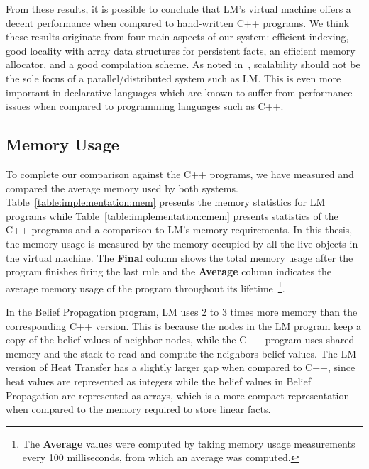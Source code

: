 From these results, it is possible to conclude that LM's virtual machine offers
a decent performance when compared to hand-written C++ programs. We think these
results originate from four main aspects of our system: efficient indexing, good
locality with array data structures for persistent facts, an efficient memory
allocator, and a good compilation scheme. As noted in~\cite{cost}, scalability
should not be the sole focus of a parallel/distributed system such as LM. This
is even more important in declarative languages which are known to suffer from
performance issues when compared to programming languages such as C++.

\subsection{Memory Usage}

To complete our comparison against the C++ programs, we have measured and
compared the average memory used by both systems.
Table~\ref{table:implementation:mem} presents the memory statistics for LM
programs while Table~\ref{table:implementation:cmem} presents statistics of the
C++ programs and a comparison to LM's memory requirements. In this thesis, the
memory usage is measured by the memory occupied by all the live objects in the
virtual machine. The \textbf{Final} column shows the total memory usage after
the program finishes firing the last rule and the \textbf{Average} column
indicates the average memory usage of the program throughout its
lifetime~\footnote{The \textbf{Average} values were computed by taking memory
usage measurements every 100 milliseconds, from which an average was computed.}.

In the Belief Propagation program, LM uses 2 to 3 times more memory than the
corresponding C++ version. This is because the nodes in the LM program keep a
copy of the belief values of neighbor nodes, while the C++ program uses shared
memory and the stack to read and compute the neighbors belief values. The LM
version of Heat Transfer has a slightly larger gap when compared to C++, since
heat values are represented as integers while the belief values in Belief
Propagation are represented as arrays, which is a more compact representation
when compared to the memory required to store linear facts.

\begin{table}[ht]
   \begin{center}
      
   \end{center}


   \label{table:implementation:mem}
\end{table}

